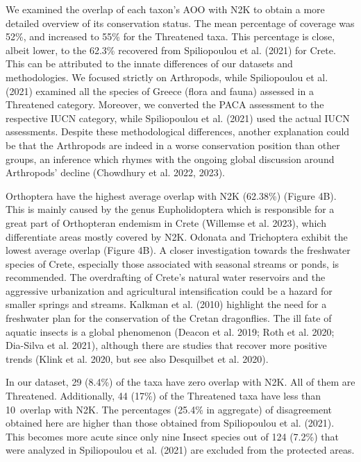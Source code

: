 We examined the overlap of each taxon’s AOO with N2K to obtain a more detailed
overview of its conservation status. The mean percentage of coverage was 52\%,
and increased to 55\% for the Threatened taxa. This percentage is close, albeit
lower, to the 62.3\% recovered from Spiliopoulou et al. (2021) for Crete. This
can be attributed to the innate differences of our datasets and methodologies.
We focused strictly on Arthropods, while Spiliopoulou et al. (2021) examined
all the species of Greece (flora and fauna) assessed in a Threatened category.
Moreover, we converted the PACA assessment to the respective IUCN category,
while Spiliopoulou et al. (2021) used the actual IUCN assessments. Despite
these methodological differences, another explanation could be that the
Arthropods are indeed in a worse conservation position than other groups, an
inference which rhymes with the ongoing global discussion around Arthropods’
decline (Chowdhury et al. 2022, 2023).

Orthoptera have the highest average overlap with N2K (62.38\%) (Figure 4B).
This is mainly caused by the genus Eupholidoptera which is responsible for a
great part of Orthopteran endemism in Crete (Willemse et al. 2023), which
differentiate areas mostly covered by N2K. Odonata and Trichoptera exhibit the
lowest average overlap (Figure 4B). A closer investigation towards the
freshwater species of Crete, especially those associated with seasonal streams
or ponds, is recommended. The overdrafting of Crete’s natural water reservoirs
and the aggressive urbanization and agricultural intensification could be a
hazard for smaller springs and streams. Kalkman et al. (2010) highlight the
need for a freshwater plan for the conservation of the Cretan dragonflies.
The ill fate of aquatic insects is a global phenomenon (Deacon et al. 2019; Roth et al. 2020; Dia-Silva et al. 2021),
although there are studies that recover more positive trends (Klink et al. 2020, but see also Desquilbet et al. 2020).

In our dataset, 29 (8.4\%) of the taxa have zero overlap with N2K. All of them
are Threatened. Additionally, 44 (17\%) of the Threatened taxa have less than
10\ overlap with N2K. The percentages (25.4\% in aggregate) of disagreement
obtained here are higher than those obtained from Spiliopoulou et al. (2021).
This becomes more acute since only nine Insect species out of 124 (7.2\%) that
were analyzed in Spiliopoulou et al. (2021) are excluded from the protected areas.

